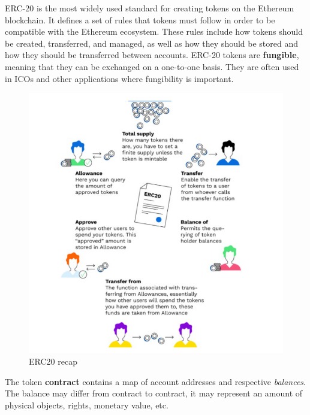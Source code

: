 \begin{paracol}{2}
   \colfill
   ERC-20 is the most widely used standard for creating tokens on the Ethereum blockchain. It defines a set of rules that tokens must follow in order to be compatible with the Ethereum ecosystem. These rules include how tokens should be created, transferred, and managed, as well as how they should be stored and how they should be transferred between accounts. ERC-20 tokens are \textbf{fungible}, meaning that they can be exchanged on a one-to-one basis. They are often used in ICOs and other applications where fungibility is important.
   \colfill
   \switchcolumn

   \begin{figure}[htbp]
      \centering
      \includegraphics{images/erc20.png}
      \caption{ERC20 recap}
      \label{fig:erc20}
   \end{figure}

\end{paracol}
   
The token \textbf{contract} contains a map of account addresses and respective \textit{balances}.
The balance may differ from contract to contract, it may represent an amount of physical objects, rights, monetary value, etc.


